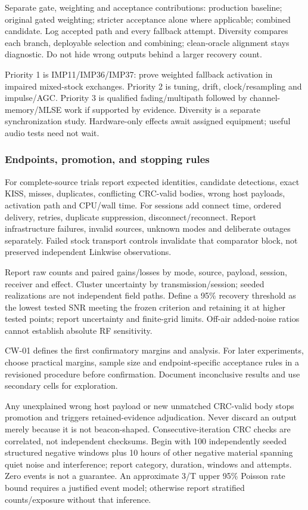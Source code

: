 \documentclass[11pt,a4paper]{article}
\begin{document}
Separate gate, weighting and acceptance contributions: production baseline; original gated weighting; stricter acceptance alone where applicable; combined candidate. Log accepted path and every fallback attempt. Diversity compares each branch, deployable selection and combining; clean-oracle alignment stays diagnostic. Do not hide wrong outputs behind a larger recovery count.

Priority 1 is IMP11/IMP36/IMP37: prove weighted fallback activation in impaired mixed-stock exchanges. Priority 2 is tuning, drift, clock/resampling and impulse/AGC. Priority 3 is qualified fading/multipath followed by channel-memory/MLSE work if supported by evidence. Diversity is a separate synchronization study. Hardware-only effects await assigned equipment; useful audio tests need not wait.

\subsubsection{Endpoints, promotion, and stopping rules}
For complete-source trials report expected identities, candidate detections, exact KISS, misses, duplicates, conflicting CRC-valid bodies, wrong host payloads, activation path and CPU/wall time. For sessions add connect time, ordered delivery, retries, duplicate suppression, disconnect/reconnect. Report infrastructure failures, invalid sources, unknown modes and deliberate outages separately. Failed stock transport controls invalidate that comparator block, not preserved independent Linkwise observations.

Report raw counts and paired gains/losses by mode, source, payload, session, receiver and effect. Cluster uncertainty by transmission/session; seeded realizations are not independent field paths. Define a 95\% recovery threshold as the lowest tested SNR meeting the frozen criterion and retaining it at higher tested points; report uncertainty and finite-grid limits. Off-air added-noise ratios cannot establish absolute RF sensitivity.

CW-01 defines the first confirmatory margins and analysis. For later experiments, choose practical margins, sample size and endpoint-specific acceptance rules in a revisioned procedure before confirmation. Document inconclusive results and use secondary cells for exploration.

Any unexplained wrong host payload or new unmatched CRC-valid body stops promotion and triggers retained-evidence adjudication. Never discard an output merely because it is not beacon-shaped. Consecutive-iteration CRC checks are correlated, not independent checksums. Begin with 100 independently seeded structured negative windows plus 10 hours of other negative material spanning quiet noise and interference; report category, duration, windows and attempts. Zero events is not a guarantee. An approximate 3/T upper 95\% Poisson rate bound requires a justified event model; otherwise report stratified counts/exposure without that inference.
\end{document}
